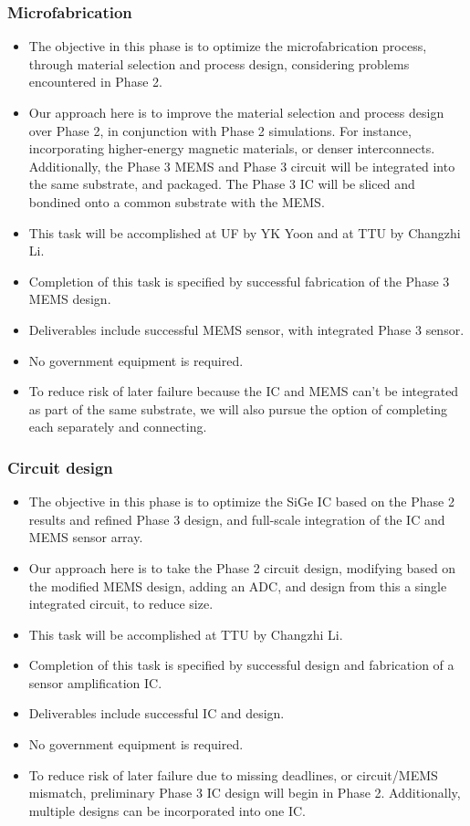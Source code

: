 \subsubsection{Microfabrication}\label{sec:p3:mf}
\begin{itemize}
\item The objective in this phase is to optimize the microfabrication process, through material selection and process design, considering problems encountered in Phase 2.
\item Our approach here is to improve the material selection and process design over Phase 2, in conjunction with Phase 2 simulations. For instance, incorporating higher-energy magnetic materials, or denser interconnects. Additionally, the Phase 3 MEMS and Phase 3 circuit will be integrated into the same substrate, and packaged. The Phase 3 IC will be sliced and bondined onto a common substrate with the MEMS.
\item This task will be accomplished at UF by YK Yoon and at TTU by Changzhi Li.
\item Completion of this task is specified by successful fabrication of the Phase 3 MEMS design.
\item Deliverables include successful MEMS sensor, with integrated Phase 3 sensor.
\item No government equipment is required.
\item To reduce risk of later failure because the IC and MEMS can't be integrated as part of the same substrate, we will also pursue the option of completing each separately and connecting. 
\end{itemize}
\subsubsection{Circuit design}\label{sec:p3:cir}
\begin{itemize}
\item The objective in this phase is to optimize the SiGe IC based on the Phase 2 results and refined Phase 3 design, and full-scale integration of the IC and MEMS sensor array.
\item Our approach here is to take the Phase 2 circuit design, modifying based on the modified MEMS design, adding an ADC,  and design from this a single integrated circuit, to reduce size. 
\item This task will be accomplished at TTU by Changzhi Li.
\item Completion of this task is specified by successful design and fabrication of a sensor amplification IC.
\item Deliverables include successful IC and design.
\item No government equipment is required.
\item To reduce risk of later failure due to missing deadlines, or circuit/MEMS mismatch, preliminary Phase 3 IC design will begin in Phase 2. Additionally, multiple designs can be incorporated into one IC.
\end{itemize}  
